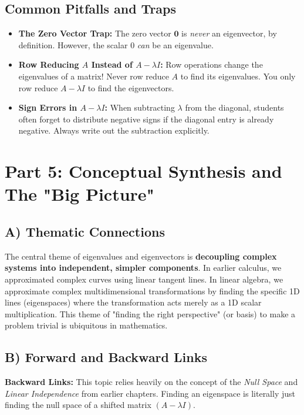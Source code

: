 \documentclass[11pt, a4paper]{article}
\theoremstyle{definition}
\theoremstyle{remark}
\begin{document}
\subsection{Common Pitfalls and Traps}
\begin{itemize}
    \item \textbf{The Zero Vector Trap:} The zero vector $\mathbf{0}$ is \textit{never} an eigenvector, by definition. However, the scalar $0$ \textit{can} be an eigenvalue.
    \item \textbf{Row Reducing $A$ Instead of $A - \lambda I$:} Row operations change the eigenvalues of a matrix! Never row reduce $A$ to find its eigenvalues. You only row reduce $A - \lambda I$ to find the eigenvectors.
    \item \textbf{Sign Errors in $A - \lambda I$:} When subtracting $\lambda$ from the diagonal, students often forget to distribute negative signs if the diagonal entry is already negative. Always write out the subtraction explicitly.
\end{itemize}

\newpage
\section{Part 5: Conceptual Synthesis and The "Big Picture"}

\subsection{A) Thematic Connections}
The central theme of eigenvalues and eigenvectors is \textbf{decoupling complex systems into independent, simpler components}. In earlier calculus, we approximated complex curves using linear tangent lines. In linear algebra, we approximate complex multidimensional transformations by finding the specific 1D lines (eigenspaces) where the transformation acts merely as a 1D scalar multiplication. This theme of "finding the right perspective" (or basis) to make a problem trivial is ubiquitous in mathematics.

\subsection{B) Forward and Backward Links}
\textbf{Backward Links:} This topic relies heavily on the concept of the \textit{Null Space} and \textit{Linear Independence} from earlier chapters. Finding an eigenspace is literally just finding the null space of a shifted matrix $(A - \lambda I)$. 
\end{document}
